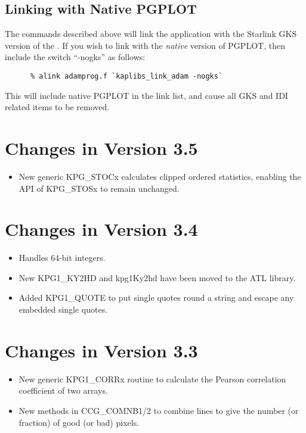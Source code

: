\subsection{Linking with Native PGPLOT}
The commands described above will link the application with the Starlink
GKS version of the . If you wish
to link with the {\em native} version of PGPLOT, then include the switch
``-nogks'' as follows:

\small
\begin{verbatim}
      % alink adamprog.f `kaplibs_link_adam -nogks`
\end{verbatim}
\normalsize

This will include native PGPLOT in the link list, and cause all GKS and IDI
related items to be removed.

\newpage
\appendix

\section{Changes in Version 3.5}
\begin{itemize}
\item New generic KPG\_STOCx calculates clipped ordered statistics,
      enabling the API of KPG\_STOSx to remain unchanged.
\end{itemize}


\section{Changes in Version 3.4}
\begin{itemize}
\item Handles 64-bit integers.
\item New KPG1\_KY2HD and kpg1Ky2hd have been moved to the ATL library.
\item Added KPG1\_QUOTE to put single quotes round a string and escape any
      embedded single quotes.
\end{itemize}


\section{Changes in Version 3.3}
\begin{itemize}
\item New generic KPG1\_CORRx routine to calculate the Pearson correlation
      coefficient of two arrays.
\item New methods in CCG\_COMNB1/2 to combine lines to give the number (or
      fraction) of good (or bad) pixels.
\end{itemize}


